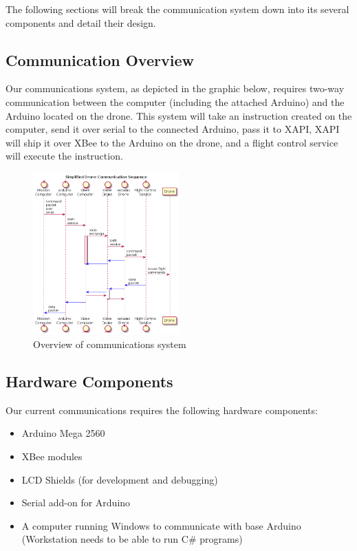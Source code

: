 \documentclass[12pt,a4paper]{article}
\begin{document}
The following sections will break the communication system down into its several components and detail their design.

	\subsection{Communication Overview}
	Our communications system, as depicted in the graphic below, requires two-way communication between the computer (including the attached Arduino) and the Arduino located on the drone. This system will take an instruction created on the computer, send it over serial to the connected Arduino, pass it to XAPI, XAPI will ship it over XBee to the Arduino on the drone, and a flight control service will execute the instruction. 
	
	\begin{figure}[h!]

  		\centering
    	\includegraphics[width=0.5\textwidth]{droneControlSequence.png}
   		\caption{Overview of communications system}
	\end{figure}
	
	\subsection{Hardware Components}
	Our current communications requires the following hardware components:
	\begin{itemize}
		\item Arduino Mega 2560
		\item XBee modules
		\item LCD Shields (for development and debugging)
		\item Serial add-on for Arduino
		\item A computer running Windows to communicate with base Arduino (Workstation needs to be able to run C\# programs)
	\end{itemize}
	
\end{document}
